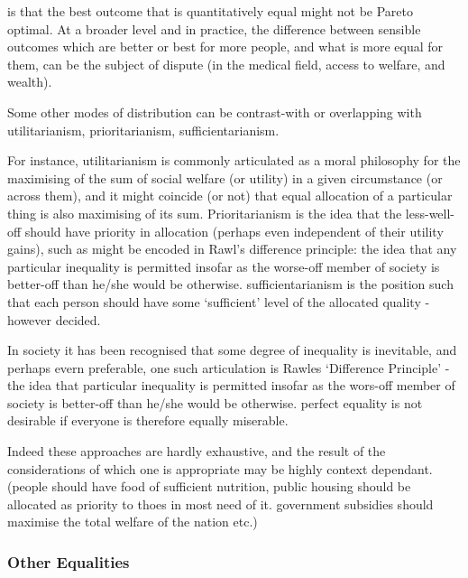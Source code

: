 is that the best outcome that is quantitatively equal might not be Pareto optimal.
At a broader level and in practice, the difference between sensible outcomes which are better or best for more people, and what is more equal for them, can be the subject of dispute (in the medical field, access to welfare, and wealth).







Some other modes of distribution can be contrast-with or overlapping with utilitarianism, prioritarianism, sufficientarianism.

For instance, utilitarianism is commonly articulated as a moral philosophy for the maximising of the sum of social welfare (or utility) in a given circumstance (or across them), and it might coincide (or not) that equal allocation of a particular thing is also maximising of its sum.
Prioritarianism is the idea that the less-well-off should have priority in allocation (perhaps even independent of their utility gains), such as might be encoded in Rawl's difference principle: the idea that any particular inequality is permitted insofar as the worse-off member of society is better-off than he/she would be otherwise.
sufficientarianism is the position such that each person should have some `sufficient' level of the allocated quality - however decided.

In society it has been recognised that some degree of inequality is inevitable, and perhaps evern preferable, one such articulation is Rawles `Difference Principle' - the idea that particular inequality is permitted insofar as the wors-off member of society is better-off than he/she would be otherwise.
perfect equality is not desirable if everyone is therefore equally miserable.

Indeed these approaches are hardly exhaustive, and the result of the considerations of which one is appropriate may be highly context dependant. (people should have food of sufficient nutrition, public housing should be allocated as priority to thoes in most need of it. government subsidies should maximise the total welfare of the nation etc.) 



\subsubsection{Other Equalities}

